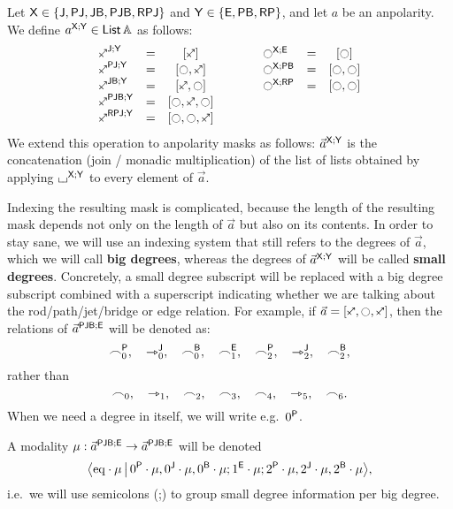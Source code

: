 \documentclass[a4paper]{memoir}
\begin{document}
\begin{definition} \label{def:pb}
	Let $\mathsf{X} \in \mathopen{}\left\{ \mathsf{J}, \mathsf{PJ}, \mathsf{JB}, \mathsf{PJB}, \mathsf{RPJ} \right\}\mathclose{}$ and $\mathsf{Y} \in \mathopen{}\left\{ \mathsf{E}, \mathsf{PB}, \mathsf{RP} \right\}\mathclose{}$, and let $a$ be an anpolarity.
	We define $a^{\mathsf{X};\mathsf{Y}} \in {\mathsf{List}}\,{\mathbb{A}}$ as follows:
	\[
		\begin{array}{l c c c l c c}
			\maskop \ypolar \maskj \mymasky &=& [\ypolar]
			&\qquad&
			\maskop \npolar \mymaskx \maske &=& [\npolar]
			\\
			\maskop \ypolar \maskpj \mymasky &=& [\npolar, \ypolar]
			&\qquad&
			\maskop \npolar \mymaskx \maskpb &=& [\npolar, \npolar]
			\\
			\maskop \ypolar \maskjb \mymasky &=& [\ypolar, \npolar]
			&\qquad&
			\maskop \npolar \mymaskx \maskrp &=& [\npolar, \npolar]
			\\
			\maskop \ypolar \maskpjb \mymasky &=& [\npolar, \ypolar, \npolar]
			\\
			\maskop \ypolar \maskrpj \mymasky &=& [\npolar, \npolar, \ypolar]
		\end{array}
	\]
	We extend this operation to anpolarity masks as follows: $\vec a^{\mathsf{X};\mathsf{Y}}$ is the concatenation (join / monadic multiplication) of the list of lists obtained by applying ${\llcorner\hspace{-.4ex}\lrcorner}^{\mathsf{X};\mathsf{Y}}$ to every element of $\vec a$.
	
	Indexing the resulting mask is complicated, because the length of the resulting mask depends not only on the length of $\vec a$ but also on its contents.
	In order to stay sane, we will use an indexing system that still refers to the degrees of $\vec a$, which we will call \textbf{big degrees}, whereas the degrees of $\vec a^{\mathsf{X};\mathsf{Y}}$ will be called \textbf{small degrees}.
	Concretely, a small degree subscript will be replaced with a big degree subscript combined with a superscript indicating whether we are talking about the rod/path/jet/bridge or edge relation.
	For example, if $\vec a = [\ypolar, \npolar, \ypolar]$, then the relations of $\vec a^{\mathsf{PJB};\mathsf{E}}$ will be denoted as:
	\[
		\frown^{\mathsf{P}}_0, \quad
		\rightarrowtriangle^{\mathsf{J}}_0, \quad
		\frown^{\mathsf{B}}_0, \quad
		\frown^{\mathsf{E}}_1, \quad
		\frown^{\mathsf{P}}_2, \quad
		\rightarrowtriangle^{\mathsf{J}}_2, \quad
		\frown^{\mathsf{B}}_2,
	\]
	rather than
	\[
		\frown_0, \quad
		\rightarrowtriangle_1, \quad
		\frown_2, \quad
		\frown_3, \quad
		\frown_4, \quad
		\rightarrowtriangle_5, \quad
		{\frown_6}.
	\]
	When we need a degree in itself, we will write e.g.\ ${0}^{\mathsf{P}}$.
	
	A modality $\mu : \vec a^{\mathsf{PJB};\mathsf{E}} \to \vec a^{\mathsf{PJB};\mathsf{E}}$ will be denoted
	\[
		\mathopen{}\left\langle {\mathrm{eq}} \cdot \mu \,\middle|\, {0}^{\mathsf{P}} \cdot \mu, {0}^{\mathsf{J}} \cdot \mu, {0}^{\mathsf{B}} \cdot \mu ; {1}^{\mathsf{E}} \cdot \mu ; {2}^{\mathsf{P}} \cdot \mu, {2}^{\mathsf{J}} \cdot \mu, {2}^{\mathsf{B}} \cdot \mu \right\rangle\mathclose{},
	\]
	i.e.\ we will use semicolons (;) to group small degree information per big degree.
\end{definition}
\end{document}
